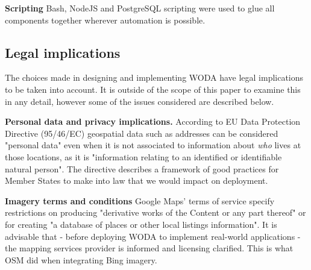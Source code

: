 \textbf{Scripting} Bash, NodeJS and PostgreSQL scripting were used to glue all components together wherever automation is possible.  

\subsection{Legal implications}

The choices made in designing and implementing WODA have legal implications to be taken into account. It is outside of the scope of this paper to examine this in any detail, however some of the issues considered are described below.

\textbf{Personal data and privacy implications.} According to EU Data Protection Directive (95/46/EC) geospatial data such as addresses can be considered "personal data" even when it is not associated to information about {\it who} lives at those locations, as it is "information relating to an identified or identifiable natural person". The directive describes a framework of good practices for Member States to make into law that we would impact on deployment.
	
\textbf{Imagery terms and conditions} Google Maps' terms of service specify restrictions on producing "derivative works of the Content or any part thereof" or for creating "a database of places or other local listings information". It is advisable that - before deploying WODA to implement real-world applications - the mapping services provider is informed and licensing clarified. This is what OSM did when integrating Bing imagery.
